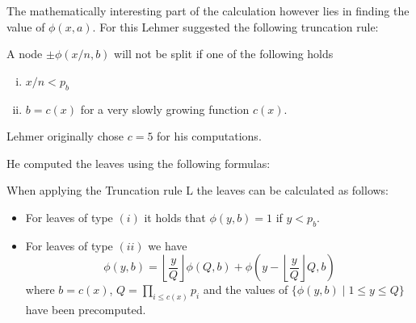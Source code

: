The mathematically interesting part of the calculation however lies in finding the value of $\phi(x,a)$.
For this Lehmer suggested the following truncation rule:

\begin{definition}
	A node $\pm \phi(x / n , b)$ will not be split if one of the following holds
	\begin{enumerate}[(i)]
		\item $x / n  < p_{b}$
		\item $b = c(x)$ for a very slowly growing function $c(x)$.
	\end{enumerate}
\end{definition}
Lehmer originally chose $c = 5$ for his computations.

He computed the leaves using the following formulas:
\begin{lemma}
	When applying the Truncation rule L the leaves can be calculated as follows:
	\begin{itemize}
		\item For leaves of type $(i)$ it holds that $\phi(y,b) = 1$ if $y < p_{b}$.
		\item For leaves of type $(ii)$ we have
			\[
				\phi(y,b) = \left\lfloor \frac{y}{Q} \right\rfloor \phi(Q,b) + \phi(y-\left\lfloor \frac{y}{Q} \right\rfloor Q,b)
			\] 
			where $b = c( x)$, $Q = \prod_{i \leq c(x)} p_{i}$ and the values of $\{\phi(y,b) \mid 1 \leq y \leq Q\} $ have been precomputed.
	\end{itemize}
\end{lemma}

